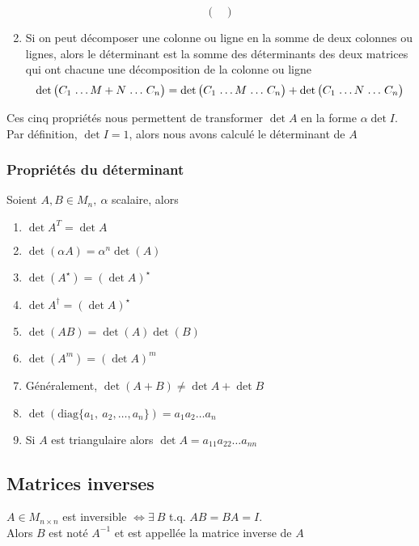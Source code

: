 \begin{enumerate}
\[\begin{pmatrix}
              \end{pmatrix}\]
    \item Si on peut décomposer une colonne ou ligne en la somme de deux colonnes ou lignes,
          alors le déterminant est la somme des déterminants des deux matrices qui ont chacune
          une décomposition de la colonne ou ligne
          \[ \det \arraycolsep=0.3\arraycolsep \begin{pmatrix}
                  C_1 & \ldots M + N & \ldots & C_n
              \end{pmatrix} = \det \begin{pmatrix}
                  C_1 & \ldots M & \ldots & C_n
              \end{pmatrix} + \det \begin{pmatrix}
                  C_1 & \ldots N & \ldots & C_n
              \end{pmatrix} \]
\end{enumerate}
Ces cinq propriétés nous permettent de transformer $\det A$ en la forme $\alpha \det I$. Par définition,
$\det I = 1$, alors nous avons calculé le déterminant de $A$

\subsubsection{Propriétés du déterminant}
Soient $A, B \in M_n, \ \alpha$ scalaire, alors \begin{enumerate}
    \item $\det A^T = \det A$
    \item $\det(\alpha A) = \alpha^n \det(A)$
    \item $\det (A^\star) = (\det A)^\star$
    \item $\det A^\dagger = (\det A)^\star$
    \item $\det(AB) = \det(A) \det(B)$
    \item $\det(A^m) = (\det A)^m$
    \item Généralement, $\det(A + B) \neq \det A + \det B$
    \item $\det(\text{diag}\{a_1, \ a_2, \ldots, a_n \}) = a_1 a_2 \dots a_n$
    \item Si $A$ est triangulaire alors $\det A = a_{11} a_{22} \dots a_{nn}$
\end{enumerate}

\subsection{Matrices inverses}
\begin{definition}
    $A \in M_{n \times n}$ est inversible $\iff \exists \ B$ t.q. $AB = BA = I$. \\
    Alors $B$ est noté $A^{-1}$ et est appellée la matrice inverse de $A$
\end{definition}
